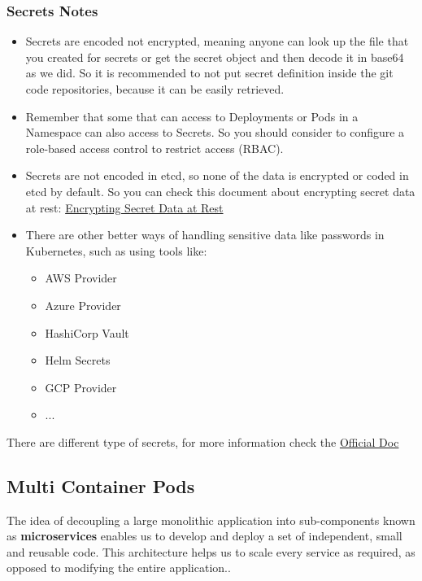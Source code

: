 \documentclass{article}
\begin{document}
\subsubsection{Secrets Notes}
\begin{itemize}
    \item Secrets are encoded not encrypted, meaning anyone can look up the file that you created for secrets or get the secret object and then decode it in base64 as we did. So it is recommended to not put secret definition inside the git code repositories, because it can be easily retrieved.
    \item Remember that some that can access to Deployments or Pods in a Namespace can also access to Secrets. So you should consider to configure a role-based access control to restrict access (RBAC).
    \item Secrets are not encoded in etcd, so none of the data is encrypted or coded in etcd by default. So you can check this document about encrypting secret data at rest: \href{https://pwittrock.github.io/docs/tasks/administer-cluster/encrypt-data/}{Encrypting Secret Data at Rest}
    \item There are other better ways of handling sensitive data like passwords in Kubernetes, such as using tools like:
    \begin{itemize}
        \item AWS Provider
        \item Azure Provider
        \item HashiCorp Vault
        \item Helm Secrets
        \item GCP Provider
        \item ...
    \end{itemize}
\end{itemize}

There are different type of secrets, for more information check the \href{https://kubernetes.io/docs/concepts/configuration/secret/}{Official Doc}

\subsection{Multi Container Pods}
The idea of decoupling a large monolithic application into sub-components known as \textbf{microservices} enables us to develop and deploy a set of independent, small and reusable code. This architecture helps us to scale every service as required, as opposed to modifying the entire application.. 
\end{document}
